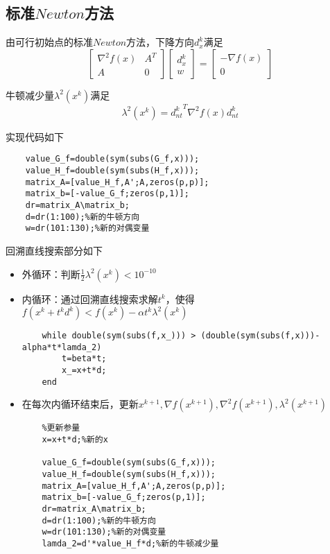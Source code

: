 \documentclass{article}
\begin{document}
\subsection{标准$Newton$方法}
由可行初始点的标准$Newton$方法，下降方向$d^k_x$满足
\begin{equation*}
    \left[\begin{array}{cc}
            \nabla^2 f(x) & A^T \\
            A             & 0
        \end{array}\right]
    \left[\begin{array}{c}
            d^k_x \\
            w
        \end{array}\right]
    =
    \left[\begin{array}{c}
            -\nabla f(x) \\
            0
        \end{array}\right]
\end{equation*}

牛顿减少量$\lambda^2(x^k)$满足
\begin{equation*}
    \lambda^2(x^k)={d^k_{nt}}^T \nabla^2 f(x) d^k_{nt}
\end{equation*}

实现代码如下
\begin{lstlisting}
    value_G_f=double(sym(subs(G_f,x)));
    value_H_f=double(sym(subs(H_f,x)));
    matrix_A=[value_H_f,A';A,zeros(p,p)];
    matrix_b=[-value_G_f;zeros(p,1)];
    dr=matrix_A\matrix_b;
    d=dr(1:100);%新的牛顿方向
    w=dr(101:130);%新的对偶变量
\end{lstlisting}

回溯直线搜索部分如下
\begin{itemize}
    \item 外循环：判断$\frac{1}{2}\lambda^2(x^k)<10^{-10}$
    \item 内循环：通过回溯直线搜索求解$t^k$，使得$f(x^k+t^kd^k)<f(x^k)-\alpha t^k \lambda^2(x^k)$
          \begin{lstlisting}
    while double(sym(subs(f,x_))) > (double(sym(subs(f,x)))-alpha*t*lamda_2)
        t=beta*t;
        x_=x+t*d;
    end
    \end{lstlisting}
    \item 在每次内循环结束后，更新$x^{k+1},\nabla f(x^{k+1}) ,\nabla^2 f(x^{k+1}),\lambda^2(x^{k+1})$
          \begin{lstlisting}
    %更新参量
    x=x+t*d;%新的x

    value_G_f=double(sym(subs(G_f,x)));
    value_H_f=double(sym(subs(H_f,x)));
    matrix_A=[value_H_f,A';A,zeros(p,p)];
    matrix_b=[-value_G_f;zeros(p,1)];
    dr=matrix_A\matrix_b;
    d=dr(1:100);%新的牛顿方向
    w=dr(101:130);%新的对偶变量
    lamda_2=d'*value_H_f*d;%新的牛顿减少量
    \end{lstlisting}
\end{itemize}
\end{document}
